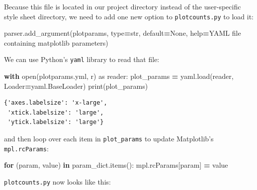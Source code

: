\documentclass[
]{krantz}
\makeatletter
\newenvironment{Shaded}{\begin{snugshade}}{\end{snugshade}}
\newcommand{\BuiltInTok}[1]{#1}
\newcommand{\ControlFlowTok}[1]{\textcolor[rgb]{0.13,0.29,0.53}{\textbf{#1}}}
\newcommand{\ImportTok}[1]{#1}
\newcommand{\KeywordTok}[1]{\textcolor[rgb]{0.13,0.29,0.53}{\textbf{#1}}}
\newcommand{\NormalTok}[1]{#1}
\newcommand{\OperatorTok}[1]{\textcolor[rgb]{0.81,0.36,0.00}{\textbf{#1}}}
\newcommand{\StringTok}[1]{\textcolor[rgb]{0.31,0.60,0.02}{#1}}
\newcommand{\VariableTok}[1]{\textcolor[rgb]{0.00,0.00,0.00}{#1}}
\newenvironment{kframe}{%
\medskip{}
\setlength{\fboxsep}{.8em}
 \def\at@end@of@kframe{}%
 \ifinner\ifhmode%
  \def\at@end@of@kframe{\end{minipage}}%
  \begin{minipage}{\columnwidth}%
 \fi\fi%
 \def\FrameCommand##1{\hskip\@totalleftmargin \hskip-\fboxsep
 \colorbox{shadecolor}{##1}\hskip-\fboxsep
     \hskip-\linewidth \hskip-\@totalleftmargin \hskip\columnwidth}%
 \MakeFramed {\advance\hsize-\width
   \@totalleftmargin\z@ \linewidth\hsize
   \@setminipage}}%
 {\par\unskip\endMakeFramed%
 \at@end@of@kframe}
\renewenvironment{Shaded}{\begin{kframe}}{\end{kframe}}
\makeatother
\begin{document}
Because this file is located in our project directory
instead of the user-specific style sheet directory,
we need to add one new option to \texttt{plotcounts.py} to load it:

\begin{Shaded}
\begin{Highlighting}[]
\NormalTok{parser.add\_argument(}\StringTok{\textquotesingle{}{-}{-}plotparams\textquotesingle{}}\NormalTok{, }\BuiltInTok{type}\OperatorTok{=}\BuiltInTok{str}\NormalTok{, default}\OperatorTok{=}\VariableTok{None}\NormalTok{,}
                    \BuiltInTok{help}\OperatorTok{=}\StringTok{\textquotesingle{}YAML file containing matplotlib parameters\textquotesingle{}}\NormalTok{)}
\end{Highlighting}
\end{Shaded}

We can use Python's \texttt{yaml} library to read that file:

\begin{Shaded}
\begin{Highlighting}[]
\ControlFlowTok{with} \BuiltInTok{open}\NormalTok{(}\StringTok{\textquotesingle{}plotparams.yml\textquotesingle{}}\NormalTok{, }\StringTok{\textquotesingle{}r\textquotesingle{}}\NormalTok{) }\ImportTok{as}\NormalTok{ reader:}
\NormalTok{    plot\_params }\OperatorTok{=}\NormalTok{ yaml.load(reader, Loader}\OperatorTok{=}\NormalTok{yaml.BaseLoader)}
\BuiltInTok{print}\NormalTok{(plot\_params)}
\end{Highlighting}
\end{Shaded}

\begin{verbatim}
{'axes.labelsize': 'x-large',
 'xtick.labelsize': 'large',
 'ytick.labelsize': 'large'}
\end{verbatim}

and then loop over each item in \texttt{plot\_params} to update Matplotlib's \texttt{mpl.rcParams}:

\begin{Shaded}
\begin{Highlighting}[]
\ControlFlowTok{for}\NormalTok{ (param, value) }\KeywordTok{in}\NormalTok{ param\_dict.items():}
\NormalTok{    mpl.rcParams[param] }\OperatorTok{=}\NormalTok{ value}
\end{Highlighting}
\end{Shaded}

\texttt{plotcounts.py} now looks like this:
\end{document}
